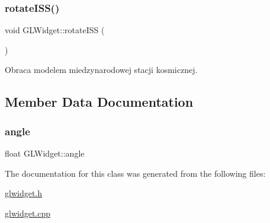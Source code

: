 \mbox{\label{class_g_l_widget_a5470f4ec06def75b98a2d98741319c5a}} 
\subsubsection{\texorpdfstring{rotate\+I\+S\+S()}{rotateISS()}}
{\footnotesize\ttfamily void G\+L\+Widget\+::rotate\+I\+SS (\begin{DoxyParamCaption}{ }\end{DoxyParamCaption})}



Obraca modelem miedzynarodowej stacji kosmicznej. 



\subsection{Member Data Documentation}
\mbox{\label{class_g_l_widget_accdb0c12ee2b5afb62f23d69e19adbf5}} 
\subsubsection{\texorpdfstring{angle}{angle}}
{\footnotesize\ttfamily float G\+L\+Widget\+::angle}



The documentation for this class was generated from the following files\+:\begin{DoxyCompactItemize}
\item 
\hyperlink{glwidget_8h}{glwidget.\+h}\item 
\hyperlink{glwidget_8cpp}{glwidget.\+cpp}\end{DoxyCompactItemize}
